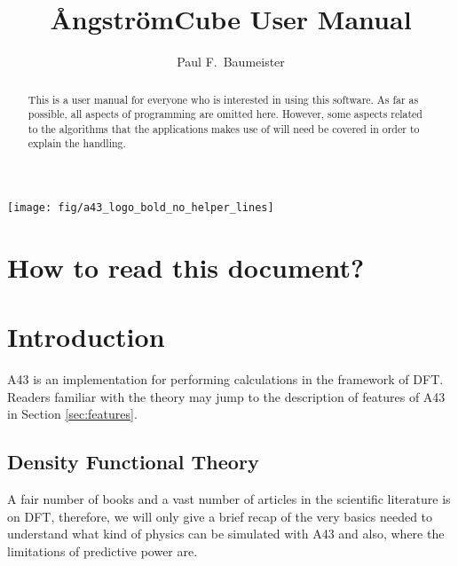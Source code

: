 \documentclass[oribibl]{llncs}
\newcommand{\fullcodename}{\AA{}ngstr\"{o}mCube}
\newcommand{\codename}{A43}
\begin{document}
\pagestyle{plain}

\title       {\fullcodename{} User Manual}
\titlerunning{\codename{} User Manual}

\author{%
  Paul F.~Baumeister %
}


\maketitle

\begin{figure*}
	\centering
	\texttt{[image: fig/a43\_logo\_bold\_no\_helper\_lines]} %
\end{figure*}

\begin{abstract}
This is a user manual for everyone who is interested in using
this software.
As far as possible, all aspects of programming are omitted here.
However, some aspects related to the algorithms that the applications 
makes use of will need be covered in order to explain the handling.
\end{abstract}

\section*{How to read this document?}

\newpage
\section{Introduction} \label{sec:intro}
%
\codename{} is an implementation for performing calculations 
in the framework of \ac{DFT}.
Readers familiar with the theory may jump to the description of 
features of \codename{} in Section \ref{sec:features}.

\subsection{Density Functional Theory} \label{sec:short-theory}
%
A fair number of books and a vast number of articles in the scientific 
literature is on \ac{DFT}, therefore, we will only give a brief recap 
of the very basics needed to understand what kind of physics can be
simulated with \codename{} and also, where the limitations of predictive power
are.
\end{document}
